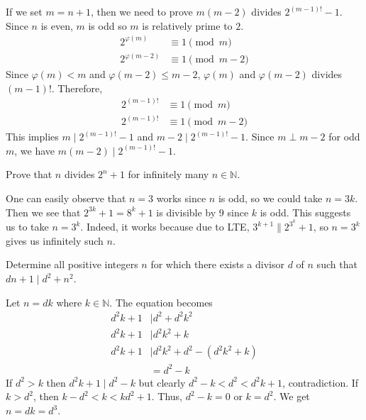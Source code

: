 \begin{solution}
	If we set $m=n+1$, then we need to prove $m(m-2)$ divides $2^{(m-1)!}-1$. Since $n$ is even, $m$ is odd so $m$ is relatively prime to $2$.
		\begin{align*}
			2^{\varphi(m)} &\equiv1\pmod m\\
			2^{\varphi(m-2)} &\equiv1\pmod{m-2}
		\end{align*}
	Since $\varphi(m)<m$ and $\varphi(m-2)\leq m-2$, $\varphi(m)$ and $\varphi(m-2)$ divides $(m-1)!$. Therefore,
		\begin{align*}
			2^{(m-1)!} & \equiv1\pmod m\\
			2^{(m-1)!} & \equiv1\pmod{m-2}
		\end{align*}
	This implies $m\mid 2^{(m-1)!}-1$ and $m-2\mid 2^{(m-1)!}-1$. Since $m\perp m-2$ for odd $m$, we have $m(m-2)\mid 2^{(m-1)!}-1$.
\end{solution}

\begin{problem}
	Prove that $n$ divides $2^n+1$ for infinitely many $n\in\mathbb{N}$.
\end{problem}

\begin{solution}
	One can easily observe that $n=3$ works since $n$ is odd, so we could take $n=3k$. Then we see that $2^{3k}+1=8^k+1$ is divisible by $9$ since $k$ is odd. This suggests us to take $n=3^k$. Indeed, it works because due to LTE, $3^{k+1}\|2^{3^k}+1$, so $n=3^k$ gives us infinitely such $n$.
\end{solution}

\begin{problem}[Croatia $2015$]
	Determine all positive integers $n$ for which there exists a divisor $d$ of $n$ such that $dn+1\mid d^2+n^2$.
\end{problem}

\begin{solution}
	Let $n=dk$ where $k\in\mathbb{N}$. The equation becomes
		\begin{align*}
			d^2k+1 & \mid d^2+d^2k^2\\
			d^2k+1 & \mid d^2k^2+k\\
			d^2k+1 & \mid d^2k^2+d^2-(d^2k^2+k)\\
	   & = d^2-k
		\end{align*}
	If $d^2>k$ then $d^2k+1\mid d^2-k$ but clearly $d^2-k<d^2<d^2k+1$, contradiction. If $k>d^2$, then $k-d^2<k<kd^2+1$. Thus, $d^2-k=0$ or $k=d^2$. We get $n=dk=d^3$.
\end{solution}

